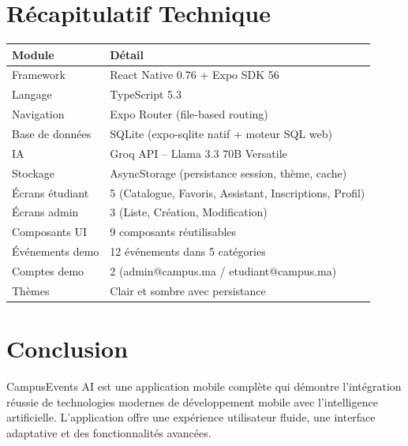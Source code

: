 \documentclass[a4paper,12pt]{report}
\begin{document}
\newpage

\chapter*{R\'{e}capitulatif Technique}

\begin{center}
\begin{tabular}{|m{4cm}|m{10cm}|}
\hline
\rowcolor{tealprimary!20}
\textbf{Module} & \textbf{D\'{e}tail} \\
\hline
Framework & React Native 0.76 + Expo SDK 56 \\
\hline
Langage & TypeScript 5.3 \\
\hline
Navigation & Expo Router (file-based routing) \\
\hline
Base de donn\'{e}es & SQLite (expo-sqlite natif + moteur SQL web) \\
\hline
IA & Groq API -- Llama 3.3 70B Versatile \\
\hline
Stockage & AsyncStorage (persistance session, th\`{e}me, cache) \\
\hline
\'{E}crans \'{e}tudiant & 5 (Catalogue, Favoris, Assistant, Inscriptions, Profil) \\
\hline
\'{E}crans admin & 3 (Liste, Cr\'{e}ation, Modification) \\
\hline
Composants UI & 9 composants r\'{e}utilisables \\
\hline
\'{E}v\'{e}nements demo & 12 \'{e}v\'{e}nements dans 5 cat\'{e}gories \\
\hline
Comptes demo & 2 (admin@campus.ma / etudiant@campus.ma) \\
\hline
Th\`{e}mes & Clair et sombre avec persistance \\
\hline
\end{tabular}
\end{center}

\newpage

\chapter*{Conclusion}

CampusEvents AI est une application mobile compl\`{e}te qui d\'{e}montre l'int\'{e}gration r\'{e}ussie de technologies modernes de d\'{e}veloppement mobile avec l'intelligence artificielle. L'application offre une exp\'{e}rience utilisateur fluide, une interface adaptative et des fonctionnalit\'{e}s avanc\'{e}es.
\end{document}
